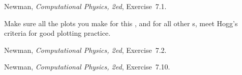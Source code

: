 \documentclass[12pt]{article}
\begin{document}
\begin{problem}
  Newman, \textit{Computational Physics, 2ed}, Exercise~7.1.
\end{problem}

\begin{note}
  Make sure all the plots you make for this \problemname, and for all other \problemname s,
  meet Hogg's criteria for good plotting practice.
\end{note}

\begin{problem}
  Newman, \textit{Computational Physics, 2ed}, Exercise~7.2.
\end{problem}

\begin{problem}
  Newman, \textit{Computational Physics, 2ed}, Exercise~7.10.
\end{problem}
\end{document}
